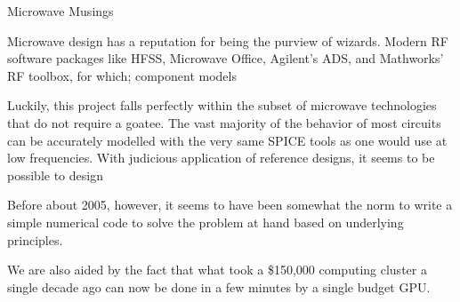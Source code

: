 \documentclass[fleqn,10pt]{article}
\begin{document}
\clearpage
{\Large Microwave Musings}\\
\begin{multicols}{1}

\noindent{}
%


Microwave design has a reputation for being the purview of wizards. Modern RF software packages like HFSS, Microwave Office, Agilent's ADS, and Mathworks' RF toolbox, for which; component models 

Luckily, this project falls perfectly within the subset of microwave technologies that do not require a goatee. The vast majority of the behavior of most circuits can be accurately modelled with the very same SPICE tools as one would use at low frequencies. With judicious application of reference designs, it seems to be possible to design 

Before about 2005, however, it seems to have been somewhat the norm to write a simple numerical code to solve the problem at hand based on underlying principles.

We are also aided by the fact that what took a \$150,000 computing cluster a single decade ago can now be done in a few minutes by a single budget GPU.


\end{multicols}
\end{document}
